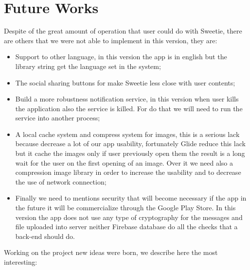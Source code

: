
\section{Future Works}
\label{sec:futureworks} 

Despite of the great amount of operation that user could do with Sweetie, there are others that we were not able to implement in this version, they are:

\begin{itemize}
	\item Support to other language, in this version the app is in english but the library string get the language set in the system;
	\item The social sharing buttons for make Sweetie less close with user contents;
	\item Build a more robustness notification service, in this version when user kills the application also the service is killed. For do that we will need to run the service into another process;
	\item A local cache system and compress system for images, this is a serious lack because decrease a lot of our  app usability, fortunately Glide reduce this lack but it cache the images only if user previously open them the result is a long wait for the user on the first opening of an image. Over it we need also a compression image library in order to increase the usability and to decrease the use of network connection;
	\item Finally we need to mentions security that will become necessary if the app in the future it will be commercialize through the Google Play Store. In this version the app does not use any type of cryptography for the messages and file uploaded into server neither Firebase database do all the checks that a back-end should do.
\end{itemize}

Working on the project new ideas were born, we describe here the most interesting:

